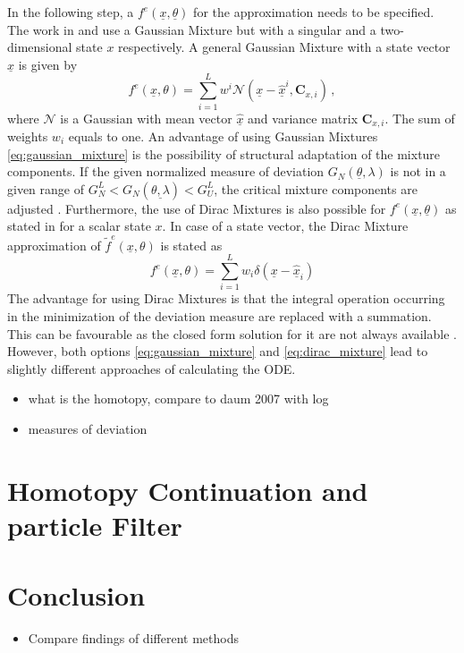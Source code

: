 \documentclass[a4paper]{IEEEtran}
\begin{document}
In the following step, a $f^e(\underline{x}, \underline{\theta})$ for the approximation needs to be specified. The work in \cite{hanebeck2003} and \cite{hanebeck2003b} use a Gaussian Mixture but with a singular and  a two-dimensional state $x$ respectively. A general Gaussian Mixture with a state vector $\underline{x}$ is given by
\begin{equation}
    f^{e}(\underline{x}, \theta) = \sum^{L}_{i=1} w^{i} \mathcal{N}(\underline{x}-\underline{\hat{x}}^{i}, \textbf{C}_{x, i}) \,,
    \label{eq:gaussian_mixture}
\end{equation}
where $\mathcal{N}$ is a Gaussian with mean vector $\underline{\hat{x}}$ and variance matrix $\textbf{C}_{x, i}$. The sum of weights $w_{i}$ equals to one.
An advantage of using Gaussian Mixtures \eqref{eq:gaussian_mixture} is the possibility of structural adaptation of the mixture components. If the given normalized measure of deviation $G_{N}(\underline{\theta}, \lambda)$ is not in a given range of $G^{L}_{N} < G_{N}(\underline{\theta, \lambda}) < G^{L}_{U}$, the critical mixture components are adjusted \cite{hanebeck2003}.
Furthermore, the use of Dirac Mixtures is also possible for $f^e(\underline{x}, \underline{\theta})$ as stated in \cite{hanebeck2012a} for a scalar state $x$. In case of a state vector, the Dirac Mixture approximation of $\tilde{f}^e(\underline{x}, \theta)$ is stated as
\begin{equation}
    f^{e}(\underline{x}, \theta) = \sum^{L}_{i=1} w_{i} \delta(\underline{x}-\hat{\underline{x}}_{i})
    \label{eq:dirac_mixture}
\end{equation}
The advantage for using Dirac Mixtures is that the integral operation occurring in the minimization of the deviation measure are replaced with a summation. This can be favourable as the closed form solution for it are not always 
available \cite{hanebeck2012a}. 
However, both options \eqref{eq:gaussian_mixture} and \eqref{eq:dirac_mixture} lead to slightly different approaches of calculating the ODE.

\label{ch:homotopy_approximation}
\begin{itemize}
    \item what is the homotopy, compare to daum 2007 with log 
    \item measures of deviation 
\end{itemize}
\section{Homotopy Continuation and particle Filter}
\label{ch:homotopy_particle_filter}


\section{Conclusion}
\label{ch:conclusion}
\begin{itemize}
    \item Compare findings of different methods
\end{itemize}




\end{document}
